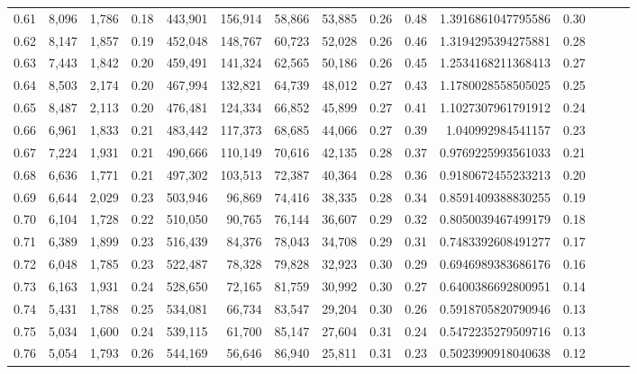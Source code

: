 \begin{tabular}{rrrrrrrrrrrrrrr}
0.61 &   8,096 &  1,786 &  0.18 &  443,901 &  156,914 &   58,866 &   53,885 &  0.26 &  0.48 &    1.3916861047795586 &      0.30 \\
0.62 &   8,147 &  1,857 &  0.19 &  452,048 &  148,767 &   60,723 &   52,028 &  0.26 &  0.46 &    1.3194295394275881 &      0.28 \\
0.63 &   7,443 &  1,842 &  0.20 &  459,491 &  141,324 &   62,565 &   50,186 &  0.26 &  0.45 &    1.2534168211368413 &      0.27 \\
0.64 &   8,503 &  2,174 &  0.20 &  467,994 &  132,821 &   64,739 &   48,012 &  0.27 &  0.43 &    1.1780028558505025 &      0.25 \\
0.65 &   8,487 &  2,113 &  0.20 &  476,481 &  124,334 &   66,852 &   45,899 &  0.27 &  0.41 &    1.1027307961791912 &      0.24 \\
0.66 &   6,961 &  1,833 &  0.21 &  483,442 &  117,373 &   68,685 &   44,066 &  0.27 &  0.39 &     1.040992984541157 &      0.23 \\
0.67 &   7,224 &  1,931 &  0.21 &  490,666 &  110,149 &   70,616 &   42,135 &  0.28 &  0.37 &    0.9769225993561033 &      0.21 \\
0.68 &   6,636 &  1,771 &  0.21 &  497,302 &  103,513 &   72,387 &   40,364 &  0.28 &  0.36 &    0.9180672455233213 &      0.20 \\
0.69 &   6,644 &  2,029 &  0.23 &  503,946 &   96,869 &   74,416 &   38,335 &  0.28 &  0.34 &    0.8591409388830255 &      0.19 \\
0.70 &   6,104 &  1,728 &  0.22 &  510,050 &   90,765 &   76,144 &   36,607 &  0.29 &  0.32 &    0.8050039467499179 &      0.18 \\
0.71 &   6,389 &  1,899 &  0.23 &  516,439 &   84,376 &   78,043 &   34,708 &  0.29 &  0.31 &    0.7483392608491277 &      0.17 \\
0.72 &   6,048 &  1,785 &  0.23 &  522,487 &   78,328 &   79,828 &   32,923 &  0.30 &  0.29 &    0.6946989383686176 &      0.16 \\
0.73 &   6,163 &  1,931 &  0.24 &  528,650 &   72,165 &   81,759 &   30,992 &  0.30 &  0.27 &    0.6400386692800951 &      0.14 \\
0.74 &   5,431 &  1,788 &  0.25 &  534,081 &   66,734 &   83,547 &   29,204 &  0.30 &  0.26 &    0.5918705820790946 &      0.13 \\
0.75 &   5,034 &  1,600 &  0.24 &  539,115 &   61,700 &   85,147 &   27,604 &  0.31 &  0.24 &    0.5472235279509716 &      0.13 \\
0.76 &   5,054 &  1,793 &  0.26 &  544,169 &   56,646 &   86,940 &   25,811 &  0.31 &  0.23 &    0.5023990918040638 &      0.12 \\

\end{tabular}
